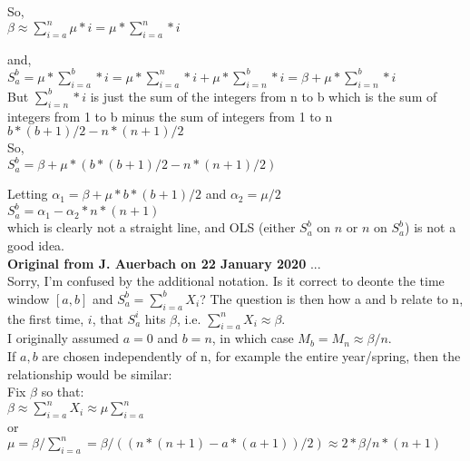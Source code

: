 \documentclass[11pt,letter]{article}
\begin{document}
So,\\

$\beta \approx \sum_{i=a}^n \mu * i =  \mu * \sum_{i=a}^n * i$

and,\\

$S_a^b = \mu * \sum_{i=a}^b * i  = \mu * \sum_{i=a}^n * i  + \mu * \sum_{i=n}^b * i  = \beta + \mu * \sum_{i=n}^b * i $\\

But $\sum_{i=n}^b * i$ is just the sum of the integers from n to b which is the sum of integers from 1 to b minus the sum of integers from 1 to n\\

$b * (b + 1) / 2 - n * (n + 1) / 2 $\\

So,\\

$S_a^b  = \beta + \mu * (b * (b + 1) / 2 - n * (n + 1) / 2)$

Letting $\alpha_1 = \beta + \mu * b * (b + 1) / 2$ and $\alpha_2 = \mu/2$\\

$S_a^b = \alpha_1 -  \alpha_2 * n * (n + 1)$\\

which is clearly not a straight line, and OLS (either $S_a^b$  on $n$ or $n$ on $S_a^b$) is not a good idea.\\

{\bf Original from J. Auerbach on 22 January 2020} ...\\

Sorry, I'm confused by the additional notation. Is it correct to deonte the time window $[a, b]$ and $S_a^b = \sum_{i = a}^b X_i $?
The question is then how a and b relate to n, the first time, $i$, that $S_a^i$ hits $\beta$, i.e. $\sum_{i=a}^n X_i \approx \beta$.\\

I originally assumed $a = 0$ and $b = n$, in which case $M_b = M_n \approx \beta / n.$ \\

If $a, b$ are chosen independently of n, for example the entire year/spring, then the relationship would be similar:\\
Fix $\beta$ so that:\\
$\beta \approx \sum_{i=a}^n X_i \approx \mu \sum_{i=a}^n$\\
or\\
$\mu = \beta / \sum_{i=a}^n  = \beta / (  (n * (n + 1) - a * (a + 1)) / 2 ) \approx 2 * \beta / n * (n +1)$\\
\end{document}
